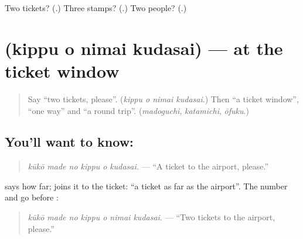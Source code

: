 \begin{tcolorbox}[breakable,colback=teal!4,colframe=teal!35!black,title={Before you move on}]
Two tickets? (\textbf{}.) Three stamps? (\textbf{}.) Two people? (\textbf{}.)
\end{tcolorbox}
\section[\texorpdfstring{\ja{きっぷを} \ja{にまい} … (kippu o nimai …)}{きっぷを にまい … (kippu o nimai …)}]{   (kippu o nimai kudasai) — at the ticket window}

\label{lesson:JA-C256-kippu-o-nimai}



\begin{quote}
Say \textquotedblleft{}two tickets, please\textquotedblright{}. (\emph{kippu o nimai kudasai}.) Then \textquotedblleft{}a ticket window\textquotedblright{}, \textquotedblleft{}one way\textquotedblright{} and \textquotedblleft{}a round trip\textquotedblright{}. (\emph{madoguchi}, \emph{katamichi}, \emph{ōfuku}.)
\end{quote}

\subsection*{You'll want to know:  }
\begin{quote}
\textbf{  }
\end{quote}

\begin{quote}
\emph{kūkō made no kippu o kudasai.} — \textquotedblleft{}A ticket to the airport, please.\textquotedblright{}
\end{quote}

\textbf{} says how far; \textbf{} joins it to the ticket: \textquotedblleft{}a ticket as far as the airport\textquotedblright{}. The number and \textbf{} go before \textbf{}:

\begin{quote}
\textbf{   }
\end{quote}

\begin{quote}
\emph{kūkō made no kippu o nimai kudasai.} — \textquotedblleft{}Two tickets to the airport, please.\textquotedblright{}
\end{quote}


